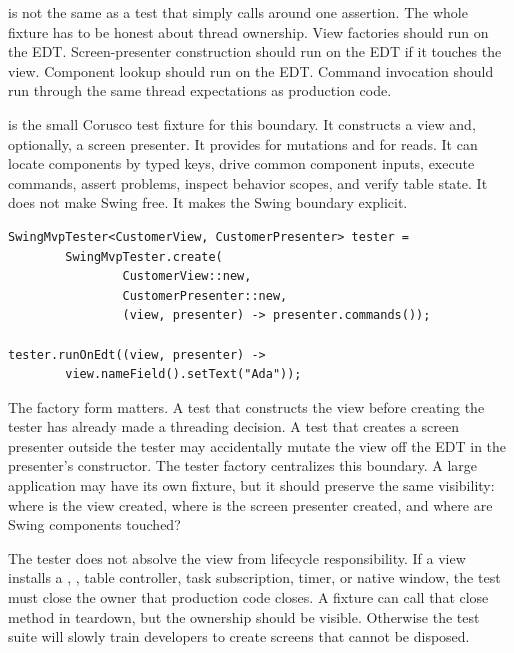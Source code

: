  is not the same as a test that simply calls  around one assertion. The whole fixture has to be honest about thread ownership. View factories should run on the EDT. Screen-presenter construction should run on the EDT if it touches the view. Component lookup should run on the EDT. Command invocation should run through the same thread expectations as production code.

 is the small Corusco test fixture for this boundary. It constructs a view and, optionally, a screen presenter. It provides  for mutations and  for reads. It can locate components by typed keys, drive common component inputs, execute commands, assert problems, inspect behavior scopes, and verify table state. It does not make Swing free. It makes the Swing boundary explicit.

\begin{lstlisting}[caption={Creating a view and presenter under the Swing tester.}]
SwingMvpTester<CustomerView, CustomerPresenter> tester =
        SwingMvpTester.create(
                CustomerView::new,
                CustomerPresenter::new,
                (view, presenter) -> presenter.commands());

tester.runOnEdt((view, presenter) ->
        view.nameField().setText("Ada"));
\end{lstlisting}

The factory form matters. A test that constructs the view before creating the tester has already made a threading decision. A test that creates a screen presenter outside the tester may accidentally mutate the view off the EDT in the presenter's constructor. The tester factory centralizes this boundary. A large application may have its own fixture, but it should preserve the same visibility: where is the view created, where is the screen presenter created, and where are Swing components touched?

The tester does not absolve the view from lifecycle responsibility. If a view installs a , , table controller, task subscription, timer, or native window, the test must close the owner that production code closes. A fixture can call that close method in teardown, but the ownership should be visible. Otherwise the test suite will slowly train developers to create screens that cannot be disposed.

